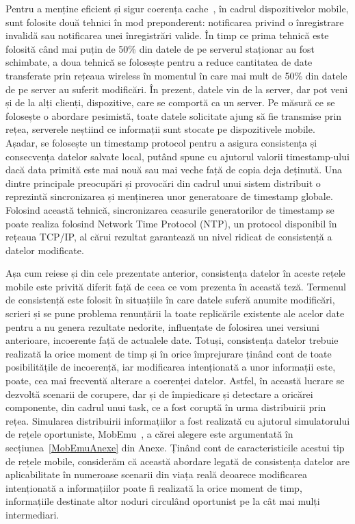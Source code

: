 \documentclass[12pt,a4paper]{report}
\begin{document}
Pentru a menține eficient și sigur coerența cache~\cite{knaesel2009high}, în cadrul dispozitivelor mobile, sunt folosite două tehnici în mod preponderent: notificarea privind o înregistrare invalidă sau notificarea unei înregistrări valide. În timp ce prima tehnică este folosită când mai puțin de 50\% din datele de pe serverul staționar au fost schimbate, a doua tehnică se folosește pentru a reduce cantitatea de date transferate prin rețeaua wireless în momentul în care mai mult de 50\% din datele de pe server au suferit modificări. În prezent, datele vin de la server, dar pot veni și de la alți clienți, dispozitive, care se comportă ca un server. Pe măsură ce se folosește o abordare pesimistă, toate datele solicitate ajung să fie transmise prin rețea, serverele neștiind ce informații sunt stocate pe dispozitivele mobile. Așadar, se folosește un timestamp protocol pentru a asigura consistența și consecvența datelor salvate local, putând spune cu ajutorul valorii timestamp-ului dacă data primită este mai nouă sau mai veche față de copia deja deținută. Una dintre principale preocupări și provocări din cadrul unui sistem distribuit o reprezintă sincronizarea și menținerea unor generatoare de timestamp globale. Folosind această tehnică, sincronizarea ceasurile generatorilor de timestamp se poate realiza folosind Network Time Protocol (NTP), un protocol disponibil în rețeaua TCP/IP, al cărui rezultat garantează un nivel ridicat de consistență a datelor modificate.

Așa cum reiese și din cele prezentate anterior, consistența datelor în aceste rețele mobile este privită diferit față de ceea ce vom prezenta în această teză. Termenul de consistență este folosit în situațiile în care datele suferă anumite modificări, scrieri și se pune problema renunțării la toate replicările existente ale acelor date pentru a nu genera rezultate nedorite, influențate de folosirea unei versiuni anterioare, incoerente față de actualele date. Totuși, consistența datelor trebuie realizată la orice moment de timp și în orice împrejurare ținând cont de toate posibilitățile de incoerență, iar modificarea intenționată a unor informații este, poate, cea mai frecventă alterare a coerenței datelor. Astfel, în această lucrare se dezvoltă scenarii de corupere, dar și de împiedicare și detectare a oricărei componente, din cadrul unui task, ce a fost coruptă în urma distribuirii prin rețea. Simularea distribuirii informațiilor a fost realizată cu ajutorul simulatorului de rețele oportuniste, MobEmu~\cite{MobEmuArticle}, a cărei alegere este argumentată în secțiunea~\ref{MobEmuAnexe} din Anexe. Ținând cont de caracteristicile acestui tip de rețele mobile, considerăm că această abordare legată de consistența datelor are aplicabilitate în numeroase scenarii din viața reală deoarece modificarea intenționată a informațiilor poate fi realizată la orice moment de timp, informațiile destinate altor noduri circulând oportunist pe la cât mai mulți intermediari.
\end{document}
